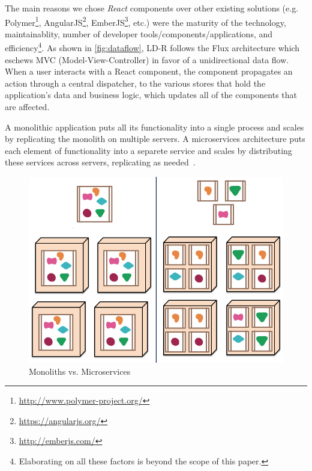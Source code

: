 \documentclass{acm_proc_article-sp}
\begin{document}
The main reasons we chose \emph{React} components over other existing solutions (e.g. Polymer\footnote{\url{http://www.polymer-project.org/}}, AngularJS\footnote{\url{https://angularjs.org/}}, EmberJS\footnote{\url{http://emberjs.com/}}, etc.) were the maturity of the technology, maintainablity, number of developer tools/components/applications, and efficiency\footnote{Elaborating on all these factors is beyond the scope of this paper.}.
As shown in \autoref{fig:dataflow}, LD-R follows the Flux architecture which eschews MVC (Model-View-Controller) in favor of a unidirectional data flow. 
When a user interacts with a React component, the component propagates an action through a central dispatcher, to the various stores that hold the application's data and business logic, which updates all of the components that are affected. 



A monolithic application puts all its functionality into a single process and scales by replicating the monolith on multiple servers.
A microservices architecture puts each element of functionality into a separete service and scales by distributing these services across servers, replicating as needed~\cite{microservices}.


\begin{figure}[tb]
  \includegraphics[width=.9\linewidth]{images/microservices.jpg}
  \caption{Monoliths vs. Microservices~\cite{microservices}}
\end{figure}
\end{document}
